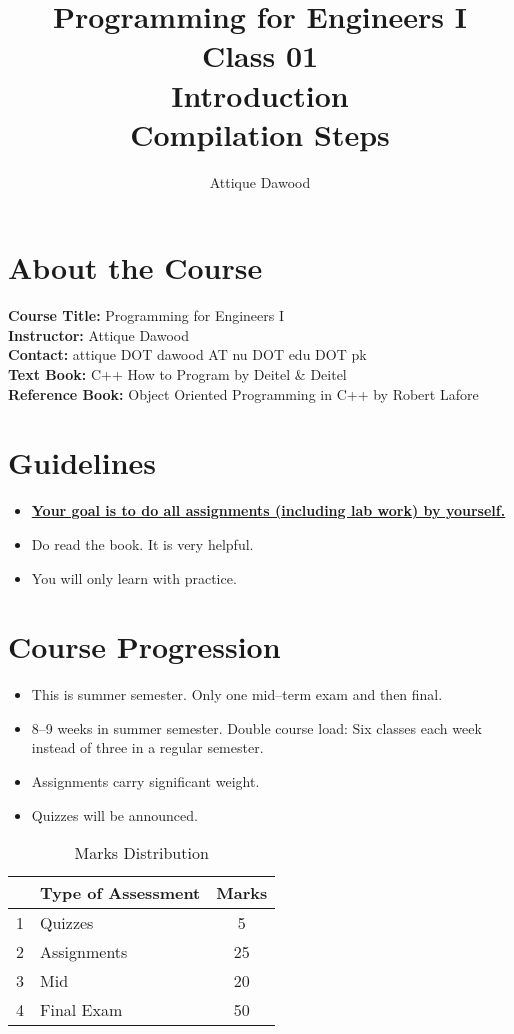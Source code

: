 \documentclass[12pt,a4paper]{article}
\title{Programming for Engineers I\\Class 01\\Introduction\\Compilation Steps}
\author{Attique Dawood}
\begin{document}
\maketitle
\section{About the Course}
\textbf{Course Title:} Programming for Engineers I\\
\textbf{Instructor:} Attique Dawood\\
\textbf{Contact:} attique DOT dawood AT nu DOT edu DOT pk\\
\textbf{Text Book:} C++ How to Program by Deitel \& Deitel\\
\textbf{Reference Book:} Object Oriented Programming in C++ by Robert Lafore\\
\section{Guidelines}
\begin{itemize}
\item \textbf{\underline{Your goal is to do all assignments (including lab work) by yourself.}}
\item Do read the book. It is very helpful.
\item You will only learn with practice.
\end{itemize}
\section{Course Progression}
\begin{itemize}
\item This is summer semester. Only one mid--term exam and then final.
\item 8--9 weeks in summer semester. Double course load: Six classes each week instead of three in a regular semester.
\item Assignments carry significant weight.
\item Quizzes will be announced.
\end{itemize}
\begin{table}[H]
\begin{center}
\vspace{0.3cm}
	\begin{tabular}{llc}
	\hline \hline
		\rule{0pt}{2.6ex} & \textbf{Type of Assessment} & \textbf{Marks}\\
		\hline
		1 \rule{0pt}{2.6ex} & Quizzes & 5\\
		2 & Assignments& 25\\
		3 & Mid & 20\\
		4 & Final Exam & 50\\
	\hline \hline
	\end{tabular}
\end{center}
\label{Marks Distribution}
\caption{Marks Distribution}
\end{table}
\end{document}
